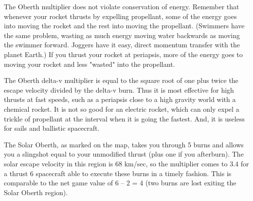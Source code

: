 \documentclass[a4paper]{book}
\begin{document}
The Oberth multiplier does not violate conservation of energy. Remember that whenever your rocket thrusts by expelling propellant, some of the energy goes into moving the rocket and the rest into moving the propellant. (Swimmers have the same problem, wasting as much energy moving water backwards as moving the swimmer forward. Joggers have it easy, direct momentum transfer with the planet Earth.) If you thrust your rocket at periapsis, more of the energy goes to moving your rocket and less "wasted" into the propellant.

The Oberth delta-v multiplier is equal to the square root of one plus twice the escape velocity divided by the delta-v burn. Thus it is most effective for high thrusts at fast speeds, such as a periapsis close to a high gravity world with a chemical rocket. It is not so good for an electric rocket, which can only expel a trickle of propellant at the interval when it is going the fastest. And, it is useless for sails and ballistic spacecraft.

The Solar Oberth, as marked on the map, takes you through 5 burns and allows you a slingshot equal to your unmodified thrust (plus one if you afterburn). The solar escape velocity in this region is 68 km/sec, so the multiplier comes to 3.4 for a thrust 6 spacecraft able to execute these burns in a timely fashion. This is comparable to the net game value of 6 – 2 = 4 (two burns are lost exiting the Solar Oberth region).
 
\end{document}
